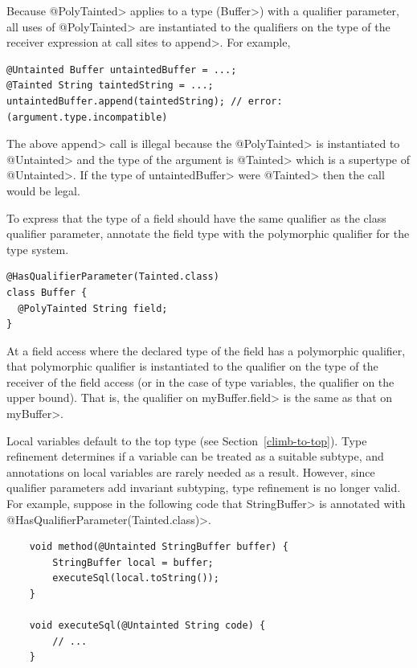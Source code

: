\noindent
Because \<@PolyTainted> applies to a type (\<Buffer>) with a qualifier parameter, all
uses of \<@PolyTainted> are instantiated to the qualifiers on the type of
the receiver expression at call sites to \<append>. For example,

\begin{Verbatim}
@Untainted Buffer untaintedBuffer = ...;
@Tainted String taintedString = ...;
untaintedBuffer.append(taintedString); // error: (argument.type.incompatible)
\end{Verbatim}
The above \<append> call is illegal because the \<@PolyTainted> is instantiated to \<@Untainted> and
the type of the argument is \<@Tainted> which is a supertype of \<@Untainted>.  If the type of
\<untaintedBuffer> were \<@Tainted> then the call would be legal.


To express that the type of a field
should have the same qualifier as the class qualifier parameter,
annotate the field type with the polymorphic qualifier for the type system.

\begin{Verbatim}
@HasQualifierParameter(Tainted.class)
class Buffer {
  @PolyTainted String field;
}
\end{Verbatim}

At a field access where the declared type of the field has a polymorphic
qualifier, that polymorphic qualifier is instantiated to the qualifier on the
type of the receiver of the field access (or in the case of type variables, the
qualifier on the upper bound).  That is, the qualifier on \<myBuffer.field>
is the same as that on \<myBuffer>.


Local variables default to the top type (see
Section~\ref{climb-to-top}). Type refinement determines if a variable can be
treated as a suitable subtype, and annotations on local variables are rarely
needed as a result. However, since qualifier parameters add invariant subtyping,
type refinement is no longer valid. For example, suppose in the following code
that \<StringBuffer> is annotated with \<@HasQualifierParameter(Tainted.class)>.

\begin{Verbatim}
    void method(@Untainted StringBuffer buffer) {
        StringBuffer local = buffer;
        executeSql(local.toString());
    }

    void executeSql(@Untainted String code) {
        // ...
    }
\end{Verbatim}

